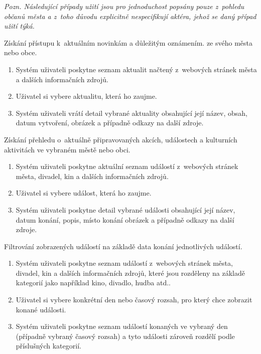 \medskip
\textit{Pozn. Následující případy užití jsou pro jednoduchost popsány pouze z~pohledu občanů města a z~toho důvodu 
explicitně nespecifikují aktéra, jehož se daný případ užití týká.
}


Získání přístupu k~aktuálním novinkám a důležitým oznámením. 
ze svého města nebo obce. %

\begin{enumerate}
  \item Systém uživateli poskytne seznam aktualit načtený z~webových stránek města a dalších informačních zdrojů.
  \item Uživatel si vybere aktualitu, která ho zaujme.
  \item Systém uživateli vrátí detail vybrané aktuality obsahující její název, obsah, datum vytvoření, obrázek a případně odkazy na další zdroje.
\end{enumerate}

Získání přehledu o~aktuálně připravovaných akcích, událostech a kulturních 
aktivitách ve vybraném městě nebo obci. 

\begin{enumerate}
  \item Systém uživateli poskytne aktuální seznam událostí z~webových stránek města, divadel, kin a dalších informačních zdrojů.
  \item Uživatel si vybere událost, která ho zaujme.
  \item Systém uživateli poskytne detail vybrané události obsahující její název, datum konání, popis, místo konání obrázek a případně odkazy na další zdroje.
\end{enumerate}

Filtrování zobrazených událostí na základě data konání jednotlivých událostí.

\begin{enumerate}
  \item Systém uživateli poskytne seznam událostí z~webových stránek města, divadel, kin a dalších informačních zdrojů, které 
  jsou rozděleny na základě kategorií jako například kino, divadlo, hudba atd..
  \item Uživatel si vybere konkrétní den nebo časový rozsah, pro který chce zobrazit konané události.
  \item Systém uživateli poskytne seznam událostí konaných ve vybraný den (případně vybraný časový rozsah) a tyto události zároveň
  rozdělí podle příslušných kategorií.
\end{enumerate}

